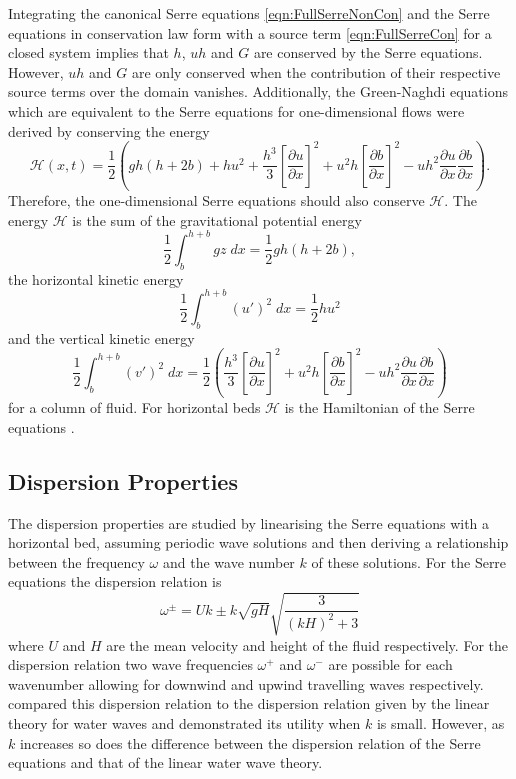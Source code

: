 Integrating the canonical Serre equations \eqref{eqn:FullSerreNonCon} and the Serre equations in conservation law form with a source term \eqref{eqn:FullSerreCon} for a closed system implies that $h$, $uh$ and $G$ are conserved by the Serre equations. However, $uh$ and $G$ are only conserved when the contribution of their respective source terms over the domain vanishes. Additionally, the Green-Naghdi equations \cite{Green-Naghdi-1976-237} which are equivalent to the Serre equations for one-dimensional flows were derived by conserving the energy
\begin{equation*}
	\mathcal{H}(x,t) = \frac{1}{2} \left( gh\left(h + 2b\right) + hu^2  + \frac{h^3}{3} \left[\frac{\partial u}{\partial x}\right]^2 + u^2h\left[\frac{\partial b}{\partial x}\right]^2 - uh^2 \frac{\partial u}{\partial x} \frac{\partial b}{\partial x}  \right).
	\label{eqn:Hamildef}
\end{equation*}
Therefore, the one-dimensional Serre equations should also conserve $\mathcal{H}$. The energy $\mathcal{H}$ is the sum of the gravitational potential energy
\[\frac{1}{2}\int_{b}^{h +b} gz \; dx = \frac{1}{2}gh\left(h + 2b\right),\]
the horizontal kinetic energy
\[\frac{1}{2}\int_{b}^{h +b} (u')^2 \; dx = \frac{1}{2}hu^2\]
and the vertical kinetic energy
\[\frac{1}{2}\int_{b}^{h +b} (v')^2 \; dx = \frac{1}{2} \left(\frac{h^3}{3} \left[\frac{\partial u}{\partial x}\right]^2 + u^2h\left[\frac{\partial b}{\partial x}\right]^2 - uh^2 \frac{\partial u}{\partial x} \frac{\partial b}{\partial x} \right)\]
for a column of fluid. For horizontal beds $\mathcal{H}$ is the Hamiltonian of the Serre equations \cite{Li-Y-2002}.

\subsection{Dispersion Properties}
The dispersion properties are studied by linearising the Serre equations with a horizontal bed, assuming periodic wave solutions and then deriving a relationship between the frequency $\omega$ and the wave number $k$ of these solutions. For the Serre equations the dispersion relation \cite{Li-2014-169} is
\begin{equation}
\label{eqn:DispersionRelation}
\omega^\pm = Uk \pm k \sqrt{gH} \sqrt{\frac{3}{\left(kH\right)^2 + 3}}
\end{equation}
where $U$ and $H$ are the mean velocity and height of the fluid respectively. For the dispersion relation two wave frequencies $\omega^+$ and $\omega^-$ are possible for each wavenumber allowing for downwind and upwind travelling waves respectively. \citet{Barthelemy-2004-315} compared this dispersion relation to the dispersion relation given by the linear theory for water waves and demonstrated its utility when $k$ is small. However, as $k$ increases so does the difference between the dispersion relation of the Serre equations and that of the linear water wave theory. 


